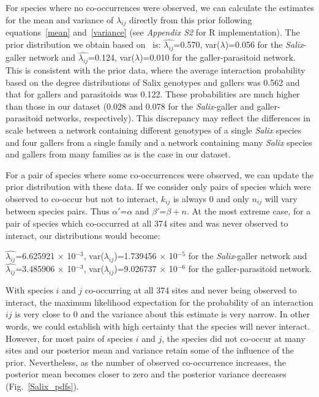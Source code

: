 \documentclass[12pt]{article}
\begin{document}
      For species where no co-occurrences were observed, we can 
      calculate the estimates for the mean and variance of 
      $\lambda_{ij}$ directly from this prior following 
      equations~\ref{mean} and~\ref{variance} 
      (see \emph{Appendix S2} for R implementation). The prior 
      distribution we obtain based on~\citet{Barbour2016,Barbour2016Dryad} is:
      $\hat{\lambda_{ij}}$=0.570, var($\lambda$)=0.056 for the \emph{Salix}-galler network and $\hat{\lambda_{ij}}$=0.124, var($\lambda$)=0.010 for the galler-parasitoid network. This is consistent with the prior data, where the average 
      interaction probability based on the degree distributions of Salix genotypes and gallers was 0.562 and that for gallers and parasitoids was 0.122. These probabilities are much higher than those in our dataset (0.028 and 0.078 for the \emph{Salix}-galler and galler-parasitoid networks, respectively). This discrepancy may reflect the differences in scale between a network containing different genotypes of a single \emph{Salix} species and four gallers from a single family and a network containing many \emph{Salix} species and gallers from many families as is the case in our dataset.

      For a pair of species where some co-occurrences were observed, we can update the prior distribution with these data. If we consider only pairs of species which were observed to co-occur but not to interact, $k_{ij}$ is always 0 and only $n_{ij}$ will vary between species pairs. Thus $\alpha'$=$\alpha$ and $\beta'$=$\beta + n$. At the most extreme case, for a pair of species which co-occurred at all 374 sites and was never observed to interact, our distributions would become:


      $\hat{\lambda_{ij}}$=6.625921 $\times$ 10$^{-3}$, var($\lambda_{ij}$)=1.739456 $\times$ 10$^{-5}$ for the \emph{Salix}-galler network and 
      $\hat{\lambda_{ij}}$=3.485906 $\times$ 10$^{-3}$, var($\lambda_{ij}$)=9.026737 $\times$ 10$^{-6}$ for the galler-parasitoid network.

      
      With species $i$ and $j$ co-occurring at all 374 sites and never being observed to interact, the maximum likelihood expectation for the probability of an interaction $ij$ is very close to 0 and the variance about this estimate is very narrow. In other words, we could establish with high certainty that the species will never interact. However, for most pairs of species $i$ and $j$, the species did not co-occur at many sites and our posterior mean and variance retain some of the influence of the prior. Nevertheless, as the number of observed co-occurrence increases, the posterior mean becomes closer to zero and the posterior variance decreases (Fig.~\ref{Salix_pdfs}).
\end{document}
